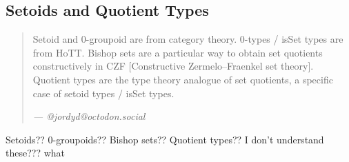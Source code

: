\documentclass{report}
\begin{document}
\subsection{Setoids and Quotient Types}

\begin{quote}
    Setoid and 0-groupoid are from category theory. 0-types / isSet types are from HoTT. Bishop sets are a particular way to obtain set quotients constructively in CZF [Constructive Zermelo--Fraenkel set theory]. Quotient types are the type theory analogue of set quotients, a specific case of setoid types / isSet types.

    \hfill\textit{--- @jordyd@octodon.social}
\end{quote}

Setoids?? 0-groupoids?? Bishop sets?? Quotient types?? I don't understand these??? what

\printbibliography[title=References]
\end{document}
